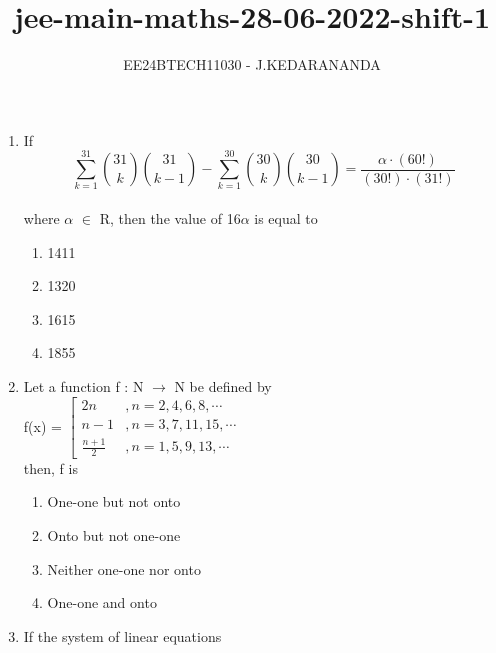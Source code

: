 \documentclass[journal]{IEEEtran}
\renewcommand{\thefigure}{\theenumi}
\renewcommand{\thetable}{\theenumi}
\numberwithin{equation}{enumi}
\numberwithin{figure}{enumi}
\renewcommand{\thetable}{\theenumi}
\begin{document}

\vspace{3cm}

\title{jee-main-maths-28-06-2022-shift-1}
\author{EE24BTECH11030 - J.KEDARANANDA}
{\let\newpage\relax\maketitle}
\renewcommand{\thefigure}{\theenumi}
\renewcommand{\thetable}{\theenumi}
\begin{enumerate}
    \item  If\\
    
    $$ \sum_{k=1}^{31} \binom{31}{k} \binom{31}{k-1} - \sum_{k=1}^{30} \binom{30}{k} \binom{30}{k-1} = \frac{\alpha \cdot (60!)}{(30!) \cdot (31!)} $$\\ where $\alpha$ $\in$ R, then the value of 16$\alpha$ is equal to 
    \begin{multicols}{4}
    \begin{enumerate}
        \item 1411
        \item 1320
        \item 1615
        \item 1855
    \end{enumerate}
    \end{multicols}
    \bigskip
    \item Let a function f : N $\rightarrow$ N be defined by\\
    f(x) = $\left[\begin{array}{ll}2n& , n = 2,4,6,8,\cdots\\ n - 1 & , n = 3,7,11,15,\cdots\\\frac{n + 1}{2}  &, n = 1,5,9,13,\cdots \end{array}\right.$\\
    then, f is 
    \begin{enumerate}
        \item One-one but not onto
        \item Onto but not one-one
        \item Neither one-one nor onto
        \item One-one and onto
    \end{enumerate} 
    \bigskip
    \item If the system of linear equations\\

\end{enumerate}
\end{document}
